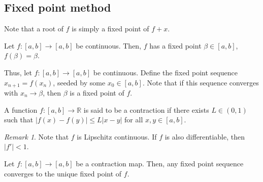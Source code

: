 \documentclass[11pt]{article}
\newcommand{\R}{\mathbb{R}}
\theoremstyle{definition}
\theoremstyle{remark}
\newtheorem*{remark}{Remark}
\numberwithin{equation}{section}
\begin{document}
    \subsection{Fixed point method}
    Note that a root of $f$ is simply a fixed point of $f + x$.

    \begin{theorem}
        Let $f\colon [a, b] \to [a, b]$ be continuous. Then, $f$ has a fixed point
        $\beta \in [a, b]$, $f(\beta) = \beta$.
    \end{theorem}
    
    Thus, let $f\colon [a, b] \to [a, b]$ be continuous. Define the fixed point
    sequence $x_{n + 1} = f(x_n)$, seeded by some $x_0 \in [a, b]$. Note that if this
    sequence converges with $x_n \to \beta$, then $\beta$ is a fixed point of $f$.

    \begin{definition}
        A function $f\colon [a, b] \to \R$ is said to be a contraction if there
        exists $L \in (0, 1)$ such that $|f(x) - f(y)| \leq L|x - y|$ for all $x,
        y\in [a, b]$.
        \begin{remark}
            Note that $f$ is Lipschitz continuous. If $f$ is also differentiable,
            then $|f'| < 1$.
        \end{remark}
    \end{definition}
    
    \begin{theorem}
        Let $f\colon [a, b] \to [a, b]$ be a contraction map. Then, any fixed point
        sequence converges to the unique fixed point of $f$.
    \end{theorem}
    
\end{document}
